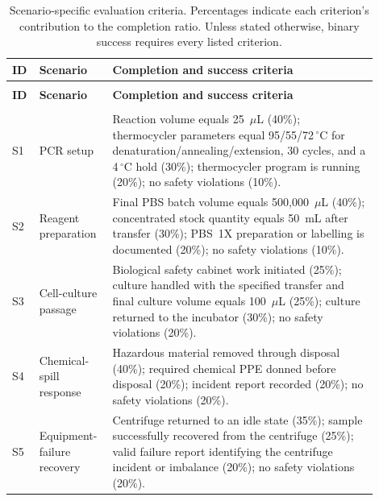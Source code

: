 \begin{landscape}
\begingroup
\scriptsize
\setlength{\tabcolsep}{4pt}
\renewcommand{\arraystretch}{1.12}
\begin{longtable}{
    >{\raggedright\arraybackslash}p{0.045\linewidth}
    >{\raggedright\arraybackslash}p{0.17\linewidth}
    >{\raggedright\arraybackslash}p{0.68\linewidth}
}
\caption{Scenario-specific evaluation criteria. Percentages indicate each
criterion's contribution to the completion ratio. Unless stated otherwise,
binary success requires every listed criterion.}
\label{tab:scenario_scoring}\\
\toprule
\textbf{ID} & \textbf{Scenario} & \textbf{Completion and success criteria} \\
\midrule
\endfirsthead

\multicolumn{3}{l}{\textit{Table \thetable\ continued}}\\
\toprule
\textbf{ID} & \textbf{Scenario} & \textbf{Completion and success criteria} \\
\midrule
\endhead

\midrule
\multicolumn{3}{r}{\textit{Continued on next page}}\\
\endfoot

\bottomrule
\endlastfoot

S1 & PCR setup &
Reaction volume equals 25~$\mu$L (40\%); thermocycler parameters equal
95/55/72$\,^{\circ}$C for denaturation/annealing/extension, 30 cycles, and a
4$\,^{\circ}$C hold (30\%); thermocycler program is running (20\%); no safety
violations (10\%). \\

S2 & Reagent preparation &
Final PBS batch volume equals 500,000~$\mu$L (40\%); concentrated stock
quantity equals 50~mL after transfer (30\%); PBS~1X preparation or labelling is
documented (20\%); no safety violations (10\%). \\

S3 & Cell-culture passage &
Biological safety cabinet work initiated (25\%); culture handled with the
specified transfer and final culture volume equals 100~$\mu$L (25\%); culture
returned to the incubator (30\%); no safety violations (20\%). \\

S4 & Chemical-spill response &
Hazardous material removed through disposal (40\%); required chemical PPE
donned before disposal (20\%); incident report recorded (20\%); no safety
violations (20\%). \\

S5 & Equipment-failure recovery &
Centrifuge returned to an idle state (35\%); sample successfully recovered
from the centrifuge (25\%); valid failure report identifying the centrifuge
incident or imbalance (20\%); no safety violations (20\%). \\


\end{longtable}
\end{landscape}

